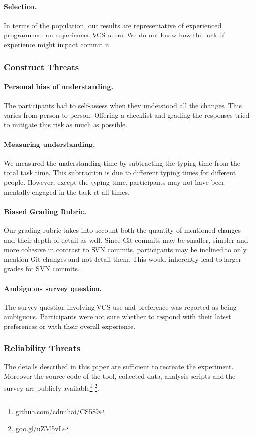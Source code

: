 \documentclass[letterpaper]{article}
\begin{document}
\paragraph{Selection.}
In terms of the population, our results are representative of experienced programmers an experiences VCS users.
We do not know how the lack of experience might impact commit u

\subsubsection{Construct Threats}

\paragraph{Personal bias of understanding.}
The participants had to self-assess when they understood all the changes. 
This varies from person to person. 
Offering a checklist and grading the responses tried to mitigate this risk as much as possible.

\paragraph{Measuring understanding.}
We measured the understanding time by subtracting the typing time from the total task time.
This subtraction is due to different typing times for different people.
However, except the typing time, participants may not have been mentally engaged in the task at all times.

\paragraph{Biased Grading Rubric.}
Our grading rubric takes into account both the quantity of mentioned changes and their depth of detail as well.
Since Git commits may be smaller, simpler and more cohesive in contrast to SVN commits, participants may be inclined to only mention Git changes and not detail them.
This would inherently lead to larger grades for SVN commits.

\paragraph{Ambiguous survey question.}
The survey question involving VCS use and preference was reported as being ambiguous.
Participants were not sure whether to respond with their latest preferences or with their overall experience.

\subsubsection{Reliability Threats}

The details described in this paper are sufficient to recreate the experiment.
Moreover the source code of the tool, collected data, analysis scripts and the survey are publicly available\footnote{\url{github.com/cdmihai/CS589}} \footnote{goo.gl/uZM5vL}.


 
\end{document}
